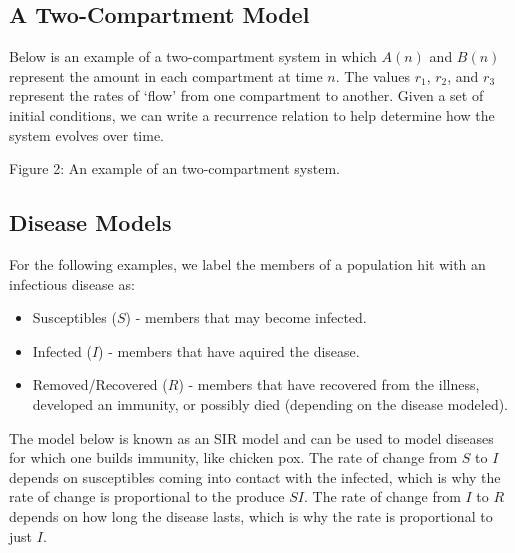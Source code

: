 \documentclass{ximera}
\begin{document}
\subsection{A Two-Compartment Model}

Below is an example of a two-compartment system in which $A(n)$ and $B(n)$
represent the amount in each compartment at time $n$. The values $r_1$,
$r_2$, and $r_3$ represent the rates of `flow' from one compartment to another.
Given a set of initial conditions, we can write a recurrence relation to help
determine how the system evolves over time.

\begin{center}
\end{center}
\begin{center}
    Figure 2: An example of an two-compartment system.
\end{center}

\subsection{Disease Models}

For the following examples, we label the members of a population hit
with an infectious disease as:
\begin{itemize}
	\item Susceptibles ($S$) - members that may become infected.
	\item Infected ($I$) - members that have aquired the disease.
	\item Removed/Recovered ($R$) - members that have recovered
		from the illness, developed an immunity, or possibly
		died (depending on the disease modeled).
\end{itemize}

The model below is known as an SIR model and can be used to model
diseases for which one builds immunity, like chicken pox. The rate
of change from $S$ to $I$ depends on susceptibles coming into
contact with the infected, which is why the rate of change is
proportional to the produce $SI$. The rate of change from $I$ to
$R$ depends on how long the disease lasts, which is why the rate 
is proportional to just $I$.
\end{document}
